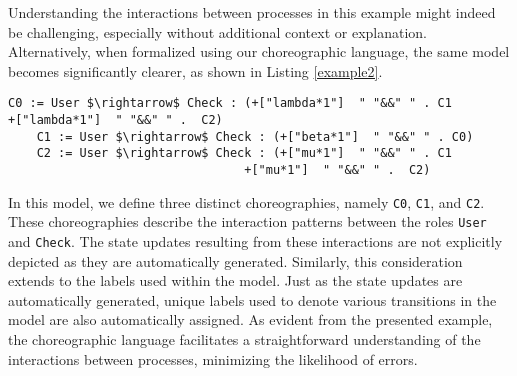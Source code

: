Understanding the interactions between processes in this example might indeed be challenging, especially without additional context or explanation. 
Alternatively, when formalized using our choreographic language, the same model becomes significantly clearer, as shown in Listing \ref{example2}. 
\begin{lstlisting}[style=chor-color,caption={Example of Listing \ref{example1} in our choreographic language},captionpos=b,label={example2}]
    C0 := User $\rightarrow$ Check : (+["lambda*1"]  " "&&" " . C1							       +["lambda*1"]  " "&&" " .  C2)
    C1 := User $\rightarrow$ Check : (+["beta*1"]  " "&&" " . C0)  
    C2 := User $\rightarrow$ Check : (+["mu*1"]  " "&&" " . C1
                                 +["mu*1"]  " "&&" " .  C2)
\end{lstlisting}
In this model, we define three distinct choreographies, namely \texttt{C0}, \texttt{C1}, and \texttt{C2}. These choreographies describe the interaction patterns between the roles \texttt{User} and \texttt{Check}. The state updates resulting from these interactions are not explicitly depicted as they are automatically generated. Similarly, this consideration extends to the labels used within the model. Just as the state updates are automatically generated, unique labels used to denote various transitions in the model are also automatically assigned.
As evident from the presented example, the choreographic language facilitates a straightforward understanding of the interactions between processes, minimizing the likelihood of errors.



